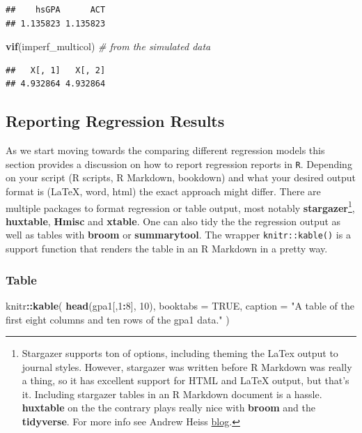\documentclass[]{book}
\newenvironment{Shaded}{\begin{snugshade}}{\end{snugshade}}
\newcommand{\CommentTok}[1]{\textcolor[rgb]{0.56,0.35,0.01}{\textit{#1}}}
\newcommand{\DataTypeTok}[1]{\textcolor[rgb]{0.13,0.29,0.53}{#1}}
\newcommand{\DecValTok}[1]{\textcolor[rgb]{0.00,0.00,0.81}{#1}}
\newcommand{\KeywordTok}[1]{\textcolor[rgb]{0.13,0.29,0.53}{\textbf{#1}}}
\newcommand{\NormalTok}[1]{#1}
\newcommand{\OperatorTok}[1]{\textcolor[rgb]{0.81,0.36,0.00}{\textbf{#1}}}
\newcommand{\OtherTok}[1]{\textcolor[rgb]{0.56,0.35,0.01}{#1}}
\newcommand{\StringTok}[1]{\textcolor[rgb]{0.31,0.60,0.02}{#1}}
\let\rmarkdownfootnote\footnote%
\def\footnote{\protect\rmarkdownfootnote}
\begin{document}
\begin{verbatim}
##    hsGPA      ACT 
## 1.135823 1.135823
\end{verbatim}

\begin{Shaded}
\begin{Highlighting}[]
\KeywordTok{vif}\NormalTok{(imperf_multicol) }\CommentTok{# from the simulated data}
\end{Highlighting}
\end{Shaded}

\begin{verbatim}
##   X[, 1]   X[, 2] 
## 4.932864 4.932864
\end{verbatim}

\hypertarget{reporting-regression-results}{%
\subsection{Reporting Regression
Results}\label{reporting-regression-results}}

As we start moving towards the comparing different regression models
this section provides a discussion on how to report regression reports
in \texttt{R}. Depending on your script (R scripts, R Markdown,
bookdown) and what your desired output format is (LaTeX, word, html) the
exact approach might differ. There are multiple packages to format
regression or table output, most notably \textbf{stargazer}\footnote{Stargazer
  supports ton of options, including theming the LaTex output to journal
  styles. However, stargazer was written before R Markdown was really a
  thing, so it has excellent support for HTML and LaTeX output, but
  that's it. Including stargazer tables in an R Markdown document is a
  hassle. \textbf{huxtable} on the the contrary plays really nice with
  \textbf{broom} and the \textbf{tidyverse}. For more info see Andrew
  Heiss
  \href{https://www.andrewheiss.com/blog/2018/03/08/amelia-broom-huxtable/}{blog}.},
\textbf{huxtable}, \textbf{Hmisc} and \textbf{xtable}. One can also tidy
the the regression output as well as tables with \textbf{broom} or
\textbf{summarytool}. The wrapper \texttt{knitr::kable()} is a support
function that renders the table in an R Markdown in a pretty way.

\hypertarget{table}{%
\subsubsection{Table}\label{table}}

\begin{Shaded}
\begin{Highlighting}[]
\NormalTok{knitr}\OperatorTok{::}\KeywordTok{kable}\NormalTok{(}
  \KeywordTok{head}\NormalTok{(gpa1[,}\DecValTok{1}\OperatorTok{:}\DecValTok{8}\NormalTok{], }\DecValTok{10}\NormalTok{), }\DataTypeTok{booktabs =} \OtherTok{TRUE}\NormalTok{, }
  \DataTypeTok{caption =} \StringTok{"A table of the first eight columns and ten rows of the gpa1 data."}
\NormalTok{)}
\end{Highlighting}
\end{Shaded}
\end{document}
